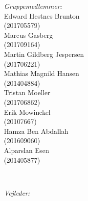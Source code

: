 \begin{titlepage}
\begin{minipage}{0.4\textwidth}
\begin{flushleft} \small
\emph{Gruppemedlemmer:} 
\\Edward Hestnes Brunton\\ (201705579)
\\Marcus Gasberg\\ (201709164) 
\\Martin Gildberg Jespersen\\ (201706221) 
\\Mathias Magnild Hansen\\ (201404884)
\\Tristan Moeller\\ (201706862)
\\Erik Mowinckel\\ (20107667)
\\Hamza Ben Abdallah\\ (201609060)
\\Alparslan Esen\\ (201405877)
\end{flushleft}
\end{minipage}
~
\begin{minipage}{0.4\textwidth}
\begin{flushright} \small

\emph{Vejleder:} \\
\vejleder \\ %
\end{flushright}
\end{minipage}\\[1cm]



{\large \afleveringsdato}\\[1cm] %


\end{titlepage}

